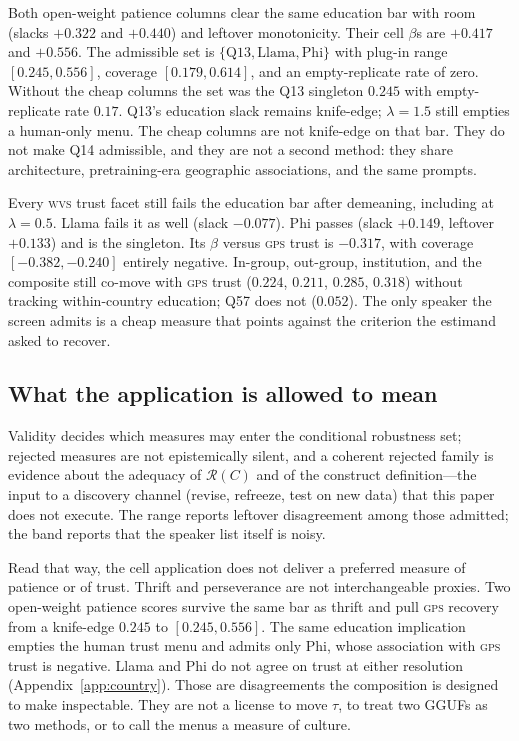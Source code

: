 \documentclass[10pt,letterpaper]{article}
\newcommand{\GPS}{\textsc{gps}}
\newcommand{\WVS}{\textsc{wvs}}
\newcommand{\Rset}{\mathcal{R}}
\begin{document}
Both open-weight patience columns clear the same education bar with room (slacks $+0.322$ and $+0.440$) and leftover monotonicity.
Their cell $\beta$s are $+0.417$ and $+0.556$.
The admissible set is $\{\mathrm{Q13},\mathrm{Llama},\mathrm{Phi}\}$ with plug-in range $[0.245,0.556]$, coverage $[0.179,0.614]$, and an empty-replicate rate of zero.
Without the cheap columns the set was the Q13 singleton $0.245$ with empty-replicate rate $0.17$.
Q13's education slack remains knife-edge; $\lambda=1.5$ still empties a human-only menu.
The cheap columns are not knife-edge on that bar.
They do not make Q14 admissible, and they are not a second method: they share architecture, pretraining-era geographic associations, and the same prompts.

Every \WVS{} trust facet still fails the education bar after demeaning, including at $\lambda=0.5$.
Llama fails it as well (slack $-0.077$).
Phi passes (slack $+0.149$, leftover $+0.133$) and is the singleton.
Its $\beta$ versus \GPS{} trust is $-0.317$, with coverage $[-0.382,-0.240]$ entirely negative.
In-group, out-group, institution, and the composite still co-move with \GPS{} trust ($0.224$, $0.211$, $0.285$, $0.318$) without tracking within-country education; Q57 does not ($0.052$).
The only speaker the screen admits is a cheap measure that points against the criterion the estimand asked to recover.

\subsection{What the application is allowed to mean}
\label{sec:app-read}

Validity decides which measures may enter the conditional robustness set; rejected measures are not epistemically silent, and a coherent rejected family is evidence about the adequacy of $\Rset(C)$ and of the construct definition---the input to a discovery channel (revise, refreeze, test on new data) that this paper does not execute.
The range reports leftover disagreement among those admitted; the band reports that the speaker list itself is noisy.

Read that way, the cell application does not deliver a preferred measure of patience or of trust.
Thrift and perseverance are not interchangeable proxies.
Two open-weight patience scores survive the same bar as thrift and pull \GPS{} recovery from a knife-edge $0.245$ to $[0.245,0.556]$.
The same education implication empties the human trust menu and admits only Phi, whose association with \GPS{} trust is negative.
Llama and Phi do not agree on trust at either resolution (Appendix~\ref{app:country}).
Those are disagreements the composition is designed to make inspectable.
They are not a license to move $\tau$, to treat two GGUFs as two methods, or to call the menus a measure of culture.
\end{document}
